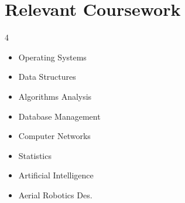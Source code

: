 
\section{Relevant Coursework}
        \begin{multicols}{4}
            \begin{itemize}[itemsep=-5pt, parsep=3pt]
                \item\small Operating Systems
                \item Data Structures
                \item Algorithms Analysis
                \item Database Management
                \item Computer Networks
                \item Statistics
                \item Artificial Intelligence
                \item Aerial Robotics Des.
            \end{itemize}
        \end{multicols}
        \vspace*{2.0\multicolsep}
\hypersetup{colorlinks=true,urlcolor=blue}
